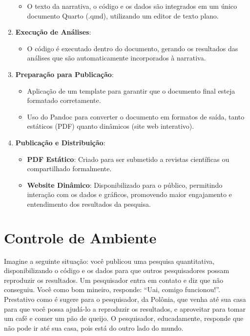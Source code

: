 \documentclass[
  a4paper,
]{article}
\providecommand{\tightlist}{%
  \setlength{\itemsep}{0pt}\setlength{\parskip}{0pt}}\usepackage{longtable,booktabs,array}
\begin{document}
\begin{tcolorbox}
\begin{enumerate}
  \begin{itemize}
  \tightlist
  \item
    O texto da narrativa, o código e os dados são integrados em um único
    documento Quarto (.qmd), utilizando um editor de texto plano.
  \end{itemize}
\item
  \textbf{Execução de Análises}:

  \begin{itemize}
  \tightlist
  \item
    O código é executado dentro do documento, gerando os resultados das
    análises que são automaticamente incorporados à narrativa.
  \end{itemize}
\item
  \textbf{Preparação para Publicação}:

  \begin{itemize}
  \tightlist
  \item
    Aplicação de um template para garantir que o documento final esteja
    formatado corretamente.
  \item
    Uso do Pandoc para converter o documento em formatos de saída, tanto
    estáticos (PDF) quanto dinâmicos (site web interativo).
  \end{itemize}
\item
  \textbf{Publicação e Distribuição}:

  \begin{itemize}
  \tightlist
  \item
    \textbf{PDF Estático}: Criado para ser submetido a revistas
    científicas ou compartilhado formalmente.
  \item
    \textbf{Website Dinâmico}: Disponibilizado para o público,
    permitindo interação com os dados e gráficos, promovendo maior
    engajamento e entendimento dos resultados da pesquisa.
  \end{itemize}
\end{enumerate}

\end{tcolorbox}


\section{Controle de Ambiente}\label{sec-docker}

Imagine a seguinte situação: você publicou uma pesquisa quantitativa,
disponibilizando o código e os dados para que outros pesquisadores
possam reproduzir os resultados. Um pesquisador entra em contato e diz
que não conseguiu. Você como bom mineiro, responde: ``Uai, comigo
funcionou!''. Prestativo como é sugere para o pesquisador, da Polônia,
que venha até sua casa para que você possa ajudá-lo a reproduzir os
resultados, e aproveitar para tomar um café e comer um pão de queijo. O
pesquisador, educadamente, responde que não pode ir até sua casa, pois
está do outro lado do mundo.
\end{document}

